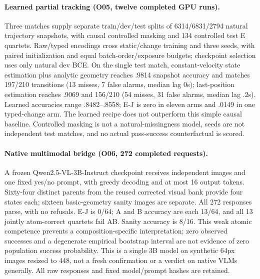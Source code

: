 \paragraph{Learned partial tracking (O05, twelve completed GPU runs).}
Three matches supply separate train/dev/test splits of 6314/6831/2794 natural trajectory snapshots, with causal controlled masking and 134 controlled test E quartets. Raw/typed encodings cross static/change training and three seeds, with paired initialization and equal batch-order/exposure budgets; checkpoint selection uses only natural dev BCE. On the single test match, constant-velocity state estimation plus analytic geometry reaches .9814 snapshot accuracy and matches 197/210 transitions (13 misses, 7 false alarms, median lag 0s); last-position estimation reaches .9069 and 156/210 (54 misses, 31 false alarms, median lag .2s). Learned accuracies range .8482--.8558; E-J is zero in eleven arms and .0149 in one typed-change arm. The learned recipe does not outperform this simple causal baseline. Controlled masking is not a natural-missingness model, seeds are not independent test matches, and no actual pass-success counterfactual is scored.

\paragraph{Native multimodal bridge (O06, 272 completed requests).}
A frozen Qwen2.5-VL-3B-Instruct checkpoint receives independent images and one fixed yes/no prompt, with greedy decoding and at most 16 output tokens. Sixty-four distinct parents from the reused corrected visual bank provide four states each; sixteen basic-geometry sanity images are separate. All 272 responses parse, with no refusals. E-J is 0/64; A and B accuracy are each 13/64, and all 13 jointly atom-correct quartets fail AB. Sanity accuracy is 8/16. This weak atomic competence prevents a composition-specific interpretation; zero observed successes and a degenerate empirical bootstrap interval are not evidence of zero population success probability. This is a single 3B model on synthetic 64px images resized to 448, not a fresh confirmation or a verdict on native VLMs generally. All raw responses and fixed model/prompt hashes are retained.

